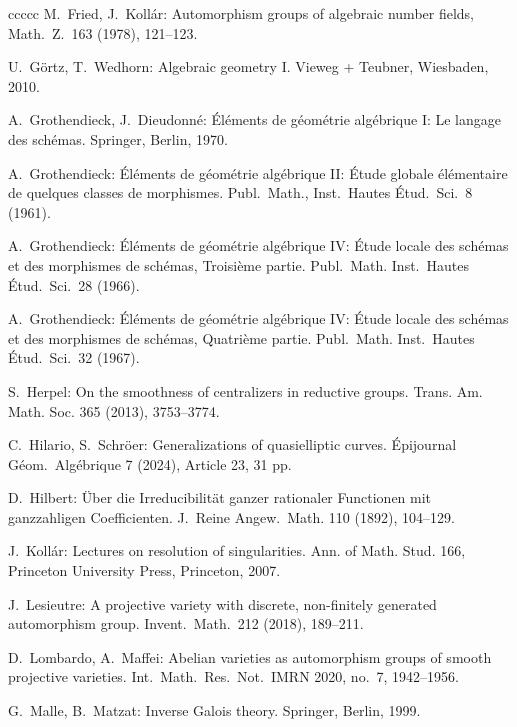 \begin{thebibliography}{ccccc}
M.\ Fried, J.\ Koll\'ar:
Automorphism groups of algebraic number fields,
Math.\ Z.\ 163 (1978),  121--123.

U.\ G\"ortz, T.\ Wedhorn:
Algebraic geometry I.
Vieweg + Teubner, Wiesbaden, 2010.

A.\ Grothendieck, J.\ Dieudonn\'e:
\'El\'ements de g\'eom\'etrie alg\'ebrique I:
Le langage des sch\'emas.
Springer, Berlin, 1970.

A.\ Grothendieck:
\'El\'ements de g\'eom\'etrie alg\'ebrique II:
\'Etude globale \'el\'ementaire de quelques classes de morphismes.
Publ.\ Math., Inst.\ Hautes \'Etud.\ Sci.\ 8 (1961).

A.\ Grothendieck:
\'El\'ements de g\'eom\'etrie alg\'ebrique IV: 
\'Etude locale des sch\'emas et des morphismes de sch\'emas,
Troisi\`eme partie.
Publ.\ Math. Inst.\ Hautes \'Etud.\ Sci.\  28 (1966).

A.\ Grothendieck:
\'El\'ements de g\'eom\'etrie alg\'ebrique IV: 
\'Etude locale des sch\'emas et des morphismes de sch\'emas,
Quatri\`eme partie.
Publ.\ Math. Inst.\ Hautes \'Etud.\ Sci.\  32 (1967).

S.\ Herpel:
On the smoothness of centralizers in reductive groups. 
Trans. Am. Math. Soc. 365 (2013), 3753--3774.

C.\ Hilario, S.\ Schr\"oer:
Generalizations of quasielliptic curves.  
\'Epijournal G\'eom.\ Alg\'ebrique 7 (2024), Article 23, 31 pp.

D.\ Hilbert:
\"Uber die Irreducibilit\"at ganzer rationaler Functionen mit ganzzahligen Coefficienten. 
J.\ Reine Angew.\ Math. 110 (1892), 104--129.  

J.\ Koll\'ar: 
Lectures on resolution of singularities.
Ann. of Math. Stud. 166, 
Princeton University Press, Princeton, 2007.

J.\ Lesieutre:
A projective variety with discrete, non-finitely generated automorphism group.  
Invent.\ Math.\ 212 (2018),  189--211. 

D.\ Lombardo, A.\ Maffei:
Abelian varieties as automorphism groups of smooth projective varieties.  
Int.\ Math.\ Res.\ Not.\ IMRN 2020, no.\ 7, 1942--1956. 

G.\ Malle, B.\ Matzat:
Inverse Galois theory. 
Springer,  Berlin, 1999.
 

\end{thebibliography}
